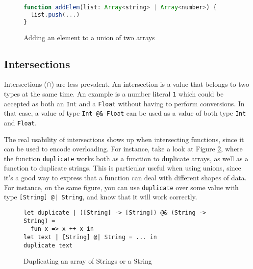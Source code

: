 \documentclass[sigplan,10pt,review,anonymous]{acmart}
\newcommand{\nickel}[1]{\lstinline[language=nickel]{#1}}
\begin{document}
\begin{figure}[h]
\begin{lstlisting}[language=JavaScript]
function addElem(list: Array<string> | Array<number>) {
  list.push(...)
}
\end{lstlisting}
\caption{Adding an element to a union of two arrays}
\label{fig:addElem}
\end{figure}



\subsection{Intersections}

Intersections ($\cap$) are less prevalent. An intersection is a value that belongs to
two types at the same time. An example is a number literal \nickel{1}
which could be accepted as both an \nickel{Int} and a \nickel{Float} without
having to perform conversions.
In that case, a value of type \nickel{Int @& Float} can be used as a value of
both type \nickel{Int} and \nickel{Float}.


The real usability of intersections shows up when intersecting
functions, since it can be used to encode overloading.
For instance, take a look at Figure
\ref{fig:intersection-overloading-ex}, where the function
\nickel{duplicate} works both as a function to duplicate
arrays, as well as a function to duplicate strings.
This is particular useful when using unions, since it's a
good way to express that a function can deal with different
shapes of data.
For instance, on the same figure, you can use \nickel{duplicate}
over some value with type \nickel{[String] @| String}, and know
that it will work correctly.

\begin{figure}[h]
\begin{lstlisting}[language=nickel]
let duplicate | ([String] -> [String]) @& (String -> String) =
  fun x => x ++ x in
let text | [String] @| String = ... in
duplicate text
\end{lstlisting}
\caption{Duplicating an array of Strings or a String}
\label{fig:intersection-overloading-ex}
\end{figure}


\end{document}

